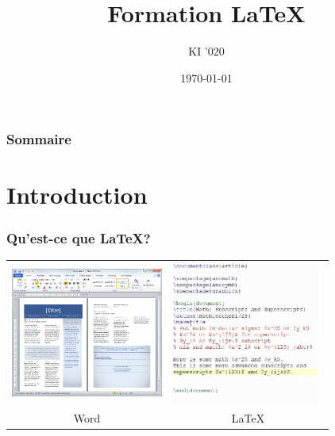\documentclass[handout]{beamer}
\title{Formation \LaTeX}
\author{KI '020}
\institute{\color{white}Ecole des Ponts Paristech}
\date{\today}
\begin{document}
	\begin{frame}
		\titlepage
	\end{frame}

	\begin{frame}
		\frametitle{Sommaire}
		\setcounter{tocdepth}{1}
		\tableofcontents
	\end{frame}

	\section{Introduction}

		\begin{frame}
			\frametitle{Qu'est-ce que \LaTeX ?}

			\begin{tabular}{cc}
				\includegraphics[width=5cm]{Images/Introduction/Word}&\includegraphics[width=5cm]{Images/Introduction/LaTeX}\\
				Word & \LaTeX
			\end{tabular}

		\end{frame}
\end{document}
